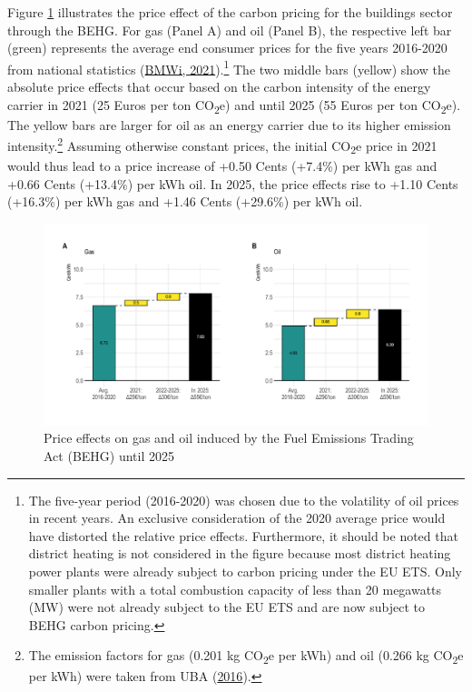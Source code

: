 \documentclass[12pt,twoside]{reedthesis}
\begin{document}
Figure \ref{fig:behg} illustrates the price effect of the carbon pricing for the buildings sector through the BEHG. For gas (Panel A) and oil (Panel B), the respective left bar (green) represents the average end consumer prices for the five years 2016-2020 from national statistics (\protect\hyperlink{ref-bmwi21}{BMWi, 2021}).\footnote{The five-year period (2016-2020) was chosen due to the volatility of oil prices in recent years. An exclusive consideration of the 2020 average price would have distorted the relative price effects. Furthermore, it should be noted that district heating is not considered in the figure because most district heating power plants were already subject to carbon pricing under the EU ETS. Only smaller plants with a total combustion capacity of less than 20 megawatts (MW) were not already subject to the EU ETS and are now subject to BEHG carbon pricing.} The two middle bars (yellow) show the absolute price effects that occur based on the carbon intensity of the energy carrier in 2021 (25 Euros per ton CO\textsubscript{2}e) and until 2025 (55 Euros per ton CO\textsubscript{2}e). The yellow bars are larger for oil as an energy carrier due to its higher emission intensity.\footnote{The emission factors for gas (0.201 kg CO\textsubscript{2}e per kWh) and oil (0.266 kg CO\textsubscript{2}e per kWh) were taken from UBA (\protect\hyperlink{ref-uba16}{2016}).} Assuming otherwise constant prices, the initial CO\textsubscript{2}e price in 2021 would thus lead to a price increase of +0.50 Cents (+7.4\%) per kWh gas and +0.66 Cents (+13.4\%) per kWh oil. In 2025, the price effects rise to +1.10 Cents (+16.3\%) per kWh gas and +1.46 Cents (+29.6\%) per kWh oil.
\begin{figure}

{\centering \includegraphics[width=1\linewidth]{figure/price_effect_behg} 

}

\caption[BEHG carbon price effects on gas and oil until 2025]{Price effects on gas and oil induced by the Fuel Emissions Trading Act (BEHG) until 2025}\label{fig:behg}
\end{figure}
\end{document}
